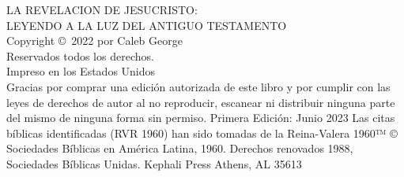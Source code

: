 \pagestyle{empty}
\frontmatter


\titleGM

\clearpage

\begin{vplace}[2]
\noindent
LA REVELACION DE JESUCRISTO: \\LEYENDO A LA LUZ DEL ANTIGUO TESTAMENTO\\
\newline
Copyright \copyright\ 2022 por Caleb George\\
Reservados todos los derechos.\\
\newline
Impreso en los Estados Unidos\\
\newline
Gracias por comprar una edición autorizada de este libro y por cumplir con las leyes de derechos de autor al no reproducir, escanear ni distribuir ninguna parte del mismo de ninguna forma sin permiso.
\newline
\newline
Primera Edición: Junio 2023
\newline
\newline
Las citas bíblicas identificadas (RVR 1960) han sido tomadas de la Reina-Valera 1960™ © Sociedades Bíblicas en América Latina, 1960. Derechos renovados 1988, Sociedades Bíblicas Unidas.
\newline
\newline
Kephali Press
\newline
Athens, AL 35613
\end{vplace}

\clearpage
\clearpage

\dedication
\clearpage


